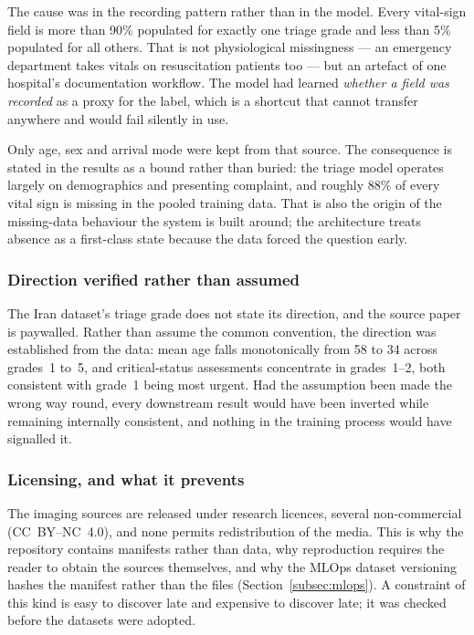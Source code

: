 The cause was in the recording pattern rather than in the model. Every vital-sign field is
more than 90\% populated for exactly one triage grade and less than 5\% populated for all
others. That is not physiological missingness --- an emergency department takes vitals on
resuscitation patients too --- but an artefact of one hospital's documentation workflow. The
model had learned \emph{whether a field was recorded} as a proxy for the label, which is a
shortcut that cannot transfer anywhere and would fail silently in use.

Only age, sex and arrival mode were kept from that source. The consequence is stated in the
results as a bound rather than buried: the triage model operates largely on demographics and
presenting complaint, and roughly 88\% of every vital sign is missing in the pooled training
data. That is also the origin of the missing-data behaviour the system is built around; the
architecture treats absence as a first-class state because the data forced the question early.

\subsubsection{Direction verified rather than assumed}

The Iran dataset's triage grade does not state its direction, and the source paper is
paywalled. Rather than assume the common convention, the direction was established from the
data: mean age falls monotonically from 58 to 34 across grades~1 to~5, and critical-status
assessments concentrate in grades~1--2, both consistent with grade~1 being most urgent. Had
the assumption been made the wrong way round, every downstream result would have been
inverted while remaining internally consistent, and nothing in the training process would have
signalled it.

\subsubsection{Licensing, and what it prevents}

The imaging sources are released under research licences, several non-commercial
(CC~BY--NC~4.0), and none permits redistribution of the media. This is why the repository
contains manifests rather than data, why reproduction requires the reader to obtain the
sources themselves, and why the MLOps dataset versioning hashes the manifest rather than the
files (Section~\ref{subsec:mlops}). A constraint of this kind is easy to discover late and
expensive to discover late; it was checked before the datasets were adopted.

